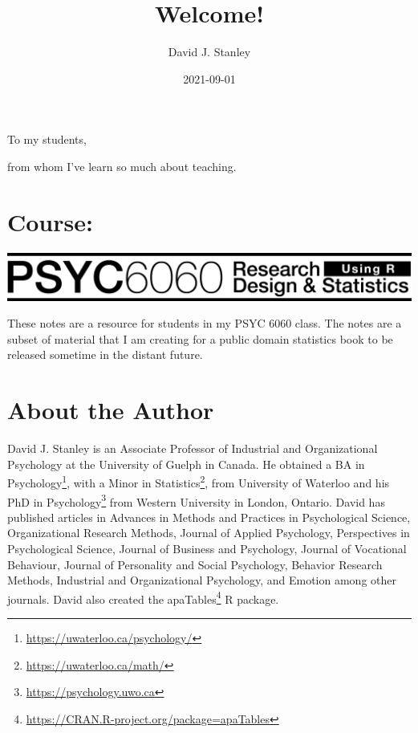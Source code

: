 \documentclass[
]{krantz}
\title{Welcome!}
\author{David J. Stanley}
\date{2021-09-01}
\renewcommand{\href}[2]{#2\footnote{\url{#1}}}
\begin{document}
\maketitle


\thispagestyle{empty}

\begin{center}
To my students,

from whom I've learn so much about teaching.
\end{center}

\setlength{\abovedisplayskip}{-5pt}
\setlength{\abovedisplayshortskip}{-5pt}

{
\hypersetup{linkcolor=}
\setcounter{tocdepth}{2}
\tableofcontents
}
\listoftables
\listoffigures
\hypertarget{course}{%
\chapter*{Course:}\label{course}}


\includegraphics[width=1\linewidth]{header_6060}

These notes are a resource for students in my PSYC 6060 class. The notes are a subset of material that I am creating for a public domain statistics book to be released sometime in the distant future.

\hypertarget{about-the-author}{%
\chapter*{About the Author}\label{about-the-author}}


David J. Stanley is an Associate Professor of Industrial and Organizational Psychology at the University of Guelph in Canada. He obtained a BA in \href{https://uwaterloo.ca/psychology/}{Psychology}, with a Minor in \href{https://uwaterloo.ca/math/}{Statistics}, from University of Waterloo and his PhD in \href{https://psychology.uwo.ca}{Psychology} from Western University in London, Ontario. David has published articles in Advances in Methods and Practices in Psychological Science, Organizational Research Methods, Journal of Applied Psychology, Perspectives in Psychological Science, Journal of Business and Psychology, Journal of Vocational Behaviour, Journal of Personality and Social Psychology, Behavior Research Methods, Industrial and Organizational Psychology, and Emotion among other journals. David also created the \href{https://CRAN.R-project.org/package=apaTables}{apaTables} R package.
\end{document}
